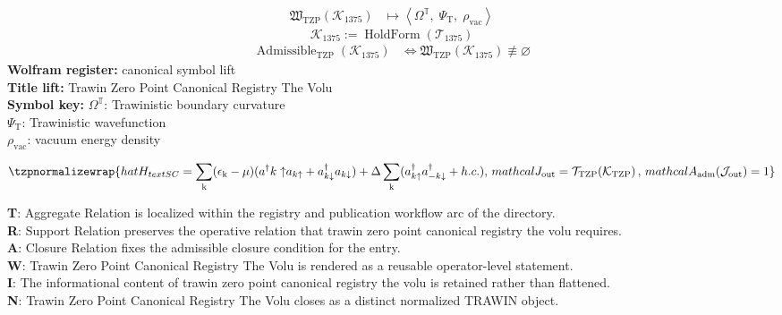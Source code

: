 \noindent
\begin{minipage}[t]{0.48\linewidth}
\begingroup
\small
\[
\begin{aligned}
\mathfrak{W}_{\mathrm{TZP}}\!\left(\mathcal{K}_{1375}\right)
&\longmapsto
\left\langle \Omega^{\mathbb{T}},\; \Psi_{\mathrm{T}},\; \rho_{\mathrm{vac}} \right\rangle
\end{aligned}
\]
\[
\mathcal{K}_{1375}
:=
\operatorname{HoldForm}\!\left(\mathcal{T}_{1375}\right)
\]
\[
\begin{aligned}
\operatorname{Admissible}_{\mathrm{TZP}}\!\left(\mathcal{K}_{1375}\right)
&\Longleftrightarrow
\mathfrak{W}_{\mathrm{TZP}}\!\left(\mathcal{K}_{1375}\right)\not\equiv\varnothing
\end{aligned}
\]
\textbf{Wolfram register:} canonical symbol lift\\
\textbf{Title lift:} Trawin Zero Point Canonical Registry The Volu\\
\textbf{Symbol key:} \(\Omega^{\mathbb{T}}\): Trawinistic boundary curvature\\ \(\Psi_{\mathrm{T}}\): Trawinistic wavefunction\\ \(\rho_{\mathrm{vac}}\): vacuum energy density
\par
\endgroup
\end{minipage}\hfill
\begin{minipage}[t]{0.48\linewidth}
\[
\tzpnormalizewrap{hat{H}_{ text{SC}} = \sum_{\mathrm{k}} (\epsilon_{\mathrm{k}} - \mu)(a^\dagger{k\uparrow} a_{k\uparrow} + a^\dagger_{k\downarrow} a_{k\downarrow}) + \Delta \sum_{\mathrm{k}} (a^\dagger_{k\uparrow} a^\dagger_{-k\downarrow} + h.c.),\,mathcal{J}_{\mathrm{out}} = \mathcal{T}_{\mathrm{TZP}}\!\left(\mathcal{K}_{\mathrm{TZP}}\right),\,mathcal{A}_{\mathrm{adm}}\!\left(\mathcal{J}_{\mathrm{out}}\right)=1}
\]

\small
\textbf{T}: Aggregate Relation is localized within the registry and publication workflow arc of the directory.\\
\textbf{R}: Support Relation preserves the operative relation that trawin zero point canonical registry the volu requires.\\
\textbf{A}: Closure Relation fixes the admissible closure condition for the entry.\\
\textbf{W}: Trawin Zero Point Canonical Registry The Volu is rendered as a reusable operator-level statement.\\
\textbf{I}: The informational content of trawin zero point canonical registry the volu is retained rather than flattened.\\
\textbf{N}: Trawin Zero Point Canonical Registry The Volu closes as a distinct normalized TRAWIN object.
\normalsize
\end{minipage}


